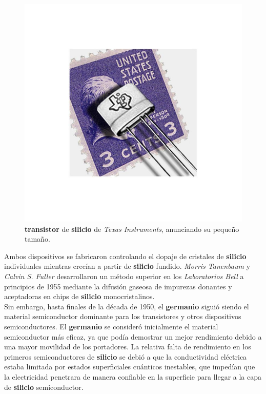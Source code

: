 \begin{figure}[htb]
	\centering
	\includegraphics[scale = 0.2]{Graphics/texas_instruments_silicon_transistor.jpg}
	\caption{\textbf{transistor} de \textbf{silicio} de \emph{Texas Instruments}, anunciando su pequeño tamaño.}
	\label{fig:5}
\end{figure}

Ambos dispositivos se fabricaron controlando el dopaje de cristales de \textbf{silicio} individuales mientras crecían a partir de \textbf{silicio} fundido. \emph{Morris
Tanenbaum} y \emph{Calvin S. Fuller} desarrollaron un método superior en los \emph {Laboratorios Bell} a principios de 1955 mediante la difusión gaseosa de impurezas
donantes y aceptadoras en chips de \textbf{silicio} monocristalinos.\\
Sin embargo, hasta finales de la década de 1950, el \textbf{germanio} siguió siendo el material semiconductor dominante para los transistores y otros dispositivos
semiconductores. El \textbf{germanio} se consideró inicialmente el material semiconductor más eficaz, ya que podía demostrar un mejor rendimiento debido a una mayor
movilidad de los portadores. La relativa falta de rendimiento en los primeros semiconductores de \textbf{silicio} se debió a que la conductividad eléctrica estaba
limitada por estados superficiales cuánticos inestables, que impedían que la electricidad penetrara de manera confiable en la superficie para llegar a la capa de \textbf
{silicio} semiconductor.\\

